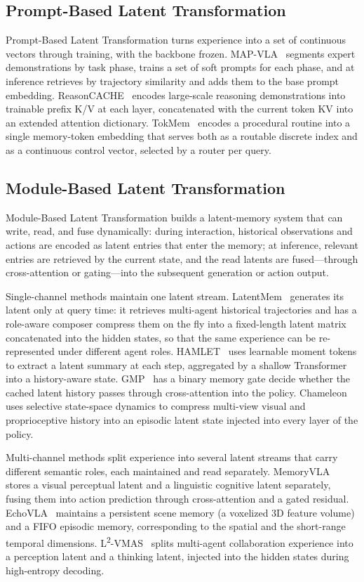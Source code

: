 \subsection{Prompt-Based Latent Transformation}

Prompt-Based Latent Transformation turns experience into a set of continuous vectors through training, with the backbone frozen. MAP-VLA~\cite{Li25g} segments expert demonstrations by task phase, trains a set of soft prompts for each phase, and at inference retrieves by trajectory similarity and adds them to the base prompt embedding. ReasonCACHE~\cite{Gup26} encodes large-scale reasoning demonstrations into trainable prefix K/V at each layer, concatenated with the current token KV into an extended attention dictionary. TokMem~\cite{Wu25c} encodes a procedural routine into a single memory-token embedding that serves both as a routable discrete index and as a continuous control vector, selected by a router per query.

\subsection{Module-Based Latent Transformation}

Module-Based Latent Transformation builds a latent-memory system that can write, read, and fuse dynamically: during interaction, historical observations and actions are encoded as latent entries that enter the memory; at inference, relevant entries are retrieved by the current state, and the read latents are fused---through cross-attention or gating---into the subsequent generation or action output.

Single-channel methods maintain one latent stream. LatentMem~\cite{Fu26} generates its latent only at query time: it retrieves multi-agent historical trajectories and has a role-aware composer compress them on the fly into a fixed-length latent matrix concatenated into the hidden states, so that the same experience can be re-represented under different agent roles. HAMLET~\cite{Koo25} uses learnable moment tokens to extract a latent summary at each step, aggregated by a shallow Transformer into a history-aware state. GMP~\cite{Gao26} has a binary memory gate decide whether the cached latent history passes through cross-attention into the policy. Chameleon~\cite{Guo26} uses selective state-space dynamics to compress multi-view visual and proprioceptive history into an episodic latent state injected into every layer of the policy.

Multi-channel methods split experience into several latent streams that carry different semantic roles, each maintained and read separately. MemoryVLA~\cite{Shi25} stores a visual perceptual latent and a linguistic cognitive latent separately, fusing them into action prediction through cross-attention and a gated residual. EchoVLA~\cite{Lin25d} maintains a persistent scene memory (a voxelized 3D feature volume) and a FIFO episodic memory, corresponding to the spatial and the short-range temporal dimensions. L\textsuperscript{2}-VMAS~\cite{Yu26d} splits multi-agent collaboration experience into a perception latent and a thinking latent, injected into the hidden states during high-entropy decoding.

